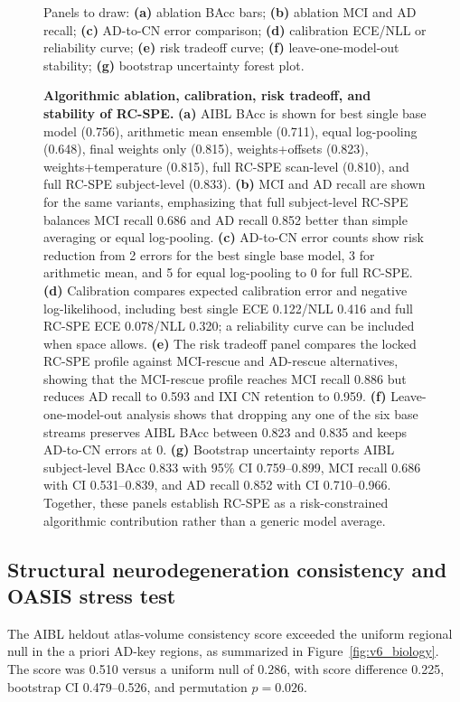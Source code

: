 \begin{figure}[p]
{\begin{minipage}[c][0.60\textheight][c]{0.94\textwidth}
    \vspace{0.8em}
    Panels to draw: \textbf{(a)} ablation BAcc bars; \textbf{(b)} ablation MCI and AD recall; \textbf{(c)} AD-to-CN error comparison; \textbf{(d)} calibration ECE/NLL or reliability curve; \textbf{(e)} risk tradeoff curve; \textbf{(f)} leave-one-model-out stability; \textbf{(g)} bootstrap uncertainty forest plot.
    \end{minipage}}
    \caption{\textbf{Algorithmic ablation, calibration, risk tradeoff, and stability of RC-SPE.} \textbf{(a)} AIBL BAcc is shown for best single base model (0.756), arithmetic mean ensemble (0.711), equal log-pooling (0.648), final weights only (0.815), weights+offsets (0.823), weights+temperature (0.815), full RC-SPE scan-level (0.810), and full RC-SPE subject-level (0.833). \textbf{(b)} MCI and AD recall are shown for the same variants, emphasizing that full subject-level RC-SPE balances MCI recall 0.686 and AD recall 0.852 better than simple averaging or equal log-pooling. \textbf{(c)} AD-to-CN error counts show risk reduction from 2 errors for the best single base model, 3 for arithmetic mean, and 5 for equal log-pooling to 0 for full RC-SPE. \textbf{(d)} Calibration compares expected calibration error and negative log-likelihood, including best single ECE 0.122/NLL 0.416 and full RC-SPE ECE 0.078/NLL 0.320; a reliability curve can be included when space allows. \textbf{(e)} The risk tradeoff panel compares the locked RC-SPE profile against MCI-rescue and AD-rescue alternatives, showing that the MCI-rescue profile reaches MCI recall 0.886 but reduces AD recall to 0.593 and IXI CN retention to 0.959. \textbf{(f)} Leave-one-model-out analysis shows that dropping any one of the six base streams preserves AIBL BAcc between 0.823 and 0.835 and keeps AD-to-CN errors at 0. \textbf{(g)} Bootstrap uncertainty reports AIBL subject-level BAcc 0.833 with 95\% CI 0.759--0.899, MCI recall 0.686 with CI 0.531--0.839, and AD recall 0.852 with CI 0.710--0.966. Together, these panels establish RC-SPE as a risk-constrained algorithmic contribution rather than a generic model average.}
    \label{fig:v6_stability}
\end{figure}

\subsection{Structural neurodegeneration consistency and OASIS stress test}
\label{sec:bio_results}

The AIBL heldout atlas-volume consistency score exceeded the uniform regional null in the a priori AD-key regions, as summarized in Figure~\ref{fig:v6_biology}. The score was 0.510 versus a uniform null of 0.286, with score difference 0.225, bootstrap CI 0.479--0.526, and permutation $p=0.026$.

